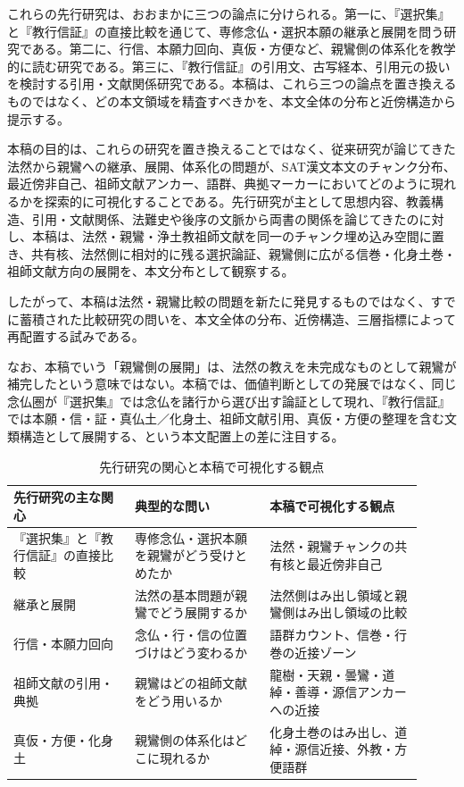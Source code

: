 \documentclass[uplatex,dvipdfmx,11pt,a4paper]{jsarticle}
\begin{document}
これらの先行研究は、おおまかに三つの論点に分けられる。第一に、『選択集』と『教行信証』の直接比較を通じて、専修念仏・選択本願の継承と展開を問う研究である。第二に、行信、本願力回向、真仮・方便など、親鸞側の体系化を教学的に読む研究である。第三に、『教行信証』の引用文、古写経本、引用元の扱いを検討する引用・文献関係研究である。本稿は、これら三つの論点を置き換えるものではなく、どの本文領域を精査すべきかを、本文全体の分布と近傍構造から提示する。

本稿の目的は、これらの研究を置き換えることではなく、従来研究が論じてきた法然から親鸞への継承、展開、体系化の問題が、SAT漢文本文のチャンク分布、最近傍非自己、祖師文献アンカー、語群、典拠マーカーにおいてどのように現れるかを探索的に可視化することである。先行研究が主として思想内容、教義構造、引用・文献関係、法難史や後序の文脈から両書の関係を論じてきたのに対し、本稿は、法然・親鸞・浄土教祖師文献を同一のチャンク埋め込み空間に置き、共有核、法然側に相対的に残る選択論証、親鸞側に広がる信巻・化身土巻・祖師文献方向の展開を、本文分布として観察する。

したがって、本稿は法然・親鸞比較の問題を新たに発見するものではなく、すでに蓄積された比較研究の問いを、本文全体の分布、近傍構造、三層指標によって再配置する試みである。

なお、本稿でいう「親鸞側の展開」は、法然の教えを未完成なものとして親鸞が補完したという意味ではない。本稿では、価値判断としての発展ではなく、同じ念仏圏が『選択集』では念仏を諸行から選び出す論証として現れ、『教行信証』では本願・信・証・真仏土／化身土、祖師文献引用、真仮・方便の整理を含む文類構造として展開する、という本文配置上の差に注目する。

\begin{table}[H]
\centering
\small
\caption{先行研究の関心と本稿で可視化する観点}
\label{tab:prior-research-positioning}
\begin{tabular}{@{}p{0.27\linewidth}p{0.30\linewidth}p{0.34\linewidth}@{}}
\toprule
先行研究の主な関心 & 典型的な問い & 本稿で可視化する観点 \\
\midrule
『選択集』と『教行信証』の直接比較 & 専修念仏・選択本願を親鸞がどう受けとめたか & 法然・親鸞チャンクの共有核と最近傍非自己 \\
継承と展開 & 法然の基本問題が親鸞でどう展開するか & 法然側はみ出し領域と親鸞側はみ出し領域の比較 \\
行信・本願力回向 & 念仏・行・信の位置づけはどう変わるか & 語群カウント、信巻・行巻の近接ゾーン \\
祖師文献の引用・典拠 & 親鸞はどの祖師文献をどう用いるか & 龍樹・天親・曇鸞・道綽・善導・源信アンカーへの近接 \\
真仮・方便・化身土 & 親鸞側の体系化はどこに現れるか & 化身土巻のはみ出し、道綽・源信近接、外教・方便語群 \\
\bottomrule
\end{tabular}
\end{table}
\end{document}
